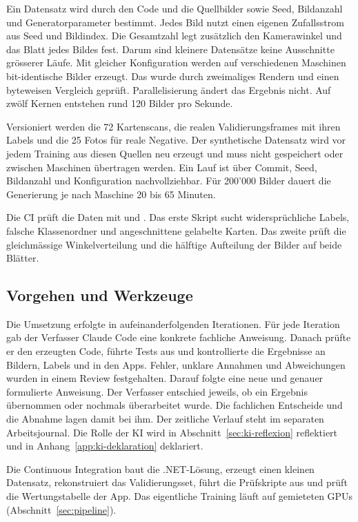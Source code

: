 Ein Datensatz wird durch den Code und die Quellbilder sowie Seed,
Bildanzahl und Generatorparameter bestimmt. Jedes Bild nutzt einen
eigenen Zufallsstrom aus Seed und Bildindex. Die Gesamtzahl legt
zusätzlich den Kamerawinkel und das Blatt jedes Bildes fest. Darum
sind kleinere Datensätze keine Ausschnitte grösserer Läufe. Mit
gleicher Konfiguration werden auf verschiedenen Maschinen
bit-identische Bilder erzeugt. Das wurde durch zweimaliges Rendern
und einen byteweisen Vergleich geprüft. Parallelisierung ändert das
Ergebnis nicht. Auf zwölf Kernen entstehen rund 120 Bilder pro
Sekunde.

Versioniert werden die 72 Kartenscans, die realen Validierungsframes
mit ihren Labels und die 25 Fotos für reale Negative. Der
synthetische Datensatz wird vor jedem Training aus diesen Quellen
neu erzeugt und muss nicht gespeichert oder zwischen Maschinen
übertragen werden. Ein Lauf ist über Commit, Seed, Bildanzahl und
Konfiguration nachvollziehbar. Für 200'000 Bilder dauert die
Generierung je nach Maschine 20 bis 65 Minuten.

Die CI prüft die Daten mit  und
. Das erste Skript sucht widersprüchliche
Labels, falsche Klassenordner und angeschnittene gelabelte Karten.
Das zweite prüft die gleichmässige Winkelverteilung und die hälftige
Aufteilung der Bilder auf beide Blätter.

\subsection{Vorgehen und Werkzeuge}\label{sec:vorgehen}

Die Umsetzung erfolgte in aufeinanderfolgenden Iterationen. Für jede
Iteration gab der Verfasser Claude Code eine konkrete fachliche
Anweisung. Danach prüfte er den erzeugten Code, führte Tests aus und
kontrollierte die Ergebnisse an Bildern, Labels und in den Apps. Fehler,
unklare Annahmen und Abweichungen wurden in einem Review festgehalten.
Darauf folgte eine neue und genauer formulierte Anweisung. Der Verfasser
entschied jeweils, ob ein Ergebnis übernommen oder nochmals überarbeitet
wurde. Die fachlichen Entscheide und die Abnahme lagen damit bei ihm.
Der zeitliche Verlauf steht im separaten Arbeitsjournal.
Die Rolle der KI wird in Abschnitt~\ref{sec:ki-reflexion} reflektiert
und in Anhang~\ref{app:ki-deklaration} deklariert.

Die Continuous Integration baut die .NET-Lösung, erzeugt einen kleinen
Datensatz, rekonstruiert das Validierungsset, führt die Prüfskripte
aus und prüft die Wertungstabelle der App. Das eigentliche Training
läuft auf gemieteten GPUs (Abschnitt~\ref{sec:pipeline}).
